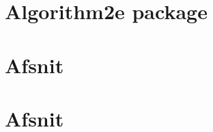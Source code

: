 \documentclass[a4paper,11pt]{article} %
\begin{document}
	
	
	
	\tableofcontents
	\newpage
	
	\section{Algorithm2e package}
	
	\newpage
	
	\section{Afsnit}
	\newpage
	
	\section{Afsnit}
	\newpage
	
\end{document}
